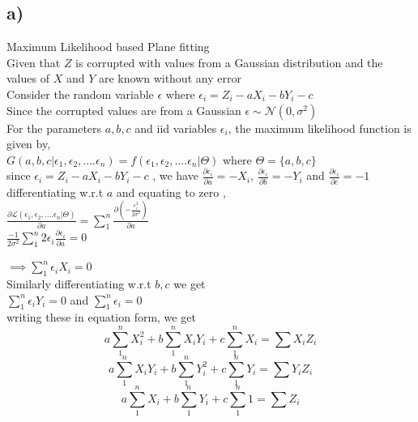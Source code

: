 \documentclass{article}
\begin{document}
\subsection*{a)}
\vspace{-10pt}
Maximum Likelihood based Plane fitting\\
Given that $Z$ is corrupted with values from a Gaussian distribution and the values of $X $ and $Y$ are known without any error\\
Consider the random variable $\epsilon$ where $\epsilon_i = Z_i - aX_i - bY_i - c$\\
Since the corrupted values are from a Gaussian $\epsilon \sim \mathcal{N}(0,\sigma^2)$\\
For the parameters $a,b,c$ and iid variables $\epsilon_i$, the maximum likelihood function is given by,\\
$G(a,b,c|\epsilon_1,\epsilon_2,....\epsilon_n) = f(\epsilon_1,\epsilon_2,....\epsilon_n | \Theta )$ where $\Theta = \{{a,b,c}\}$\\
since $\epsilon_i = Z_i - aX_i - bY_i - c$ , we have $\frac{\partial {\epsilon_i}}{\partial a} = -X_i$, $\frac{\partial {\epsilon_i}}{\partial b} = -Y_i$ and $\frac{\partial {\epsilon_i}}{\partial c} = -1$\\
differentiating w.r.t $a$ and equating to zero ,\\
$\frac{\partial \mathcal{L}(\epsilon_1,\epsilon_2,....\epsilon_n | \Theta )}{\partial a} = \sum_1^n \frac{\partial (-\frac{\epsilon_i^2}{2\sigma^2})}{\partial a}$\\
$\frac{-1}{2\sigma^2} \sum_1^n 2\epsilon_i \frac{\partial {\epsilon_i}}{\partial a} = 0$\par 
$\implies \sum_1^n \epsilon_iX_i = 0$\\ 
Similarly  differentiating w.r.t $b,c$ we get \\
$\sum_1^n \epsilon_iY_i = 0$ and $\sum_1^n \epsilon_i = 0$\\
writing these in equation form, we get \\
\begin{equation}
a \sum_1^n X_i^2 + b \sum_1^n X_iY_i + c \sum_1^n X_i = \sum X_iZ_i
\end{equation}
\begin{equation}
a \sum_1^n X_iY_i + b \sum_1^n Y_i^2 + c \sum_1^n Y_i = \sum Y_iZ_i
\end{equation}
\begin{equation}
a \sum_1^n X_i + b \sum_1^n Y_i + c \sum_1^n 1 = \sum Z_i
\end{equation}
\end{document}
